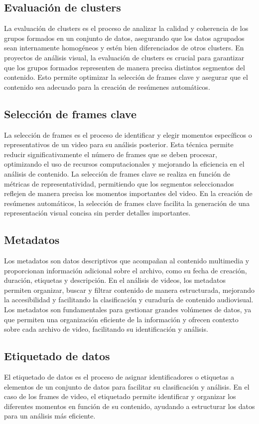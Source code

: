 \subsection{Evaluación de clusters}
La evaluación de clusters es el proceso de analizar la calidad y coherencia de los grupos formados en un conjunto de datos, asegurando que los datos agrupados sean internamente homogéneos y estén bien diferenciados de otros clusters. En proyectos de análisis visual, la evaluación de clusters es crucial para garantizar que los grupos formados representen de manera precisa distintos segmentos del contenido. Esto permite optimizar la selección de frames clave y asegurar que el contenido sea adecuado para la creación de resúmenes automáticos.

\subsection{Selección de frames clave}
La selección de frames es el proceso de identificar y elegir momentos específicos o representativos de un video para su análisis posterior. Esta técnica permite reducir significativamente el número de frames que se deben procesar, optimizando el uso de recursos computacionales y mejorando la eficiencia en el análisis de contenido. La selección de frames clave se realiza en función de métricas de representatividad, permitiendo que los segmentos seleccionados reflejen de manera precisa los momentos importantes del video. En la creación de resúmenes automáticos, la selección de frames clave facilita la generación de una representación visual concisa sin perder detalles importantes.

\subsection{Metadatos}
Los metadatos son datos descriptivos que acompañan al contenido multimedia y proporcionan información adicional sobre el archivo, como su fecha de creación, duración, etiquetas y descripción. En el análisis de videos, los metadatos permiten organizar, buscar y filtrar contenido de manera estructurada, mejorando la accesibilidad y facilitando la clasificación y curaduría de contenido audiovisual. Los metadatos son fundamentales para gestionar grandes volúmenes de datos, ya que permiten una organización eficiente de la información y ofrecen contexto sobre cada archivo de video, facilitando su identificación y análisis.

\subsection{Etiquetado de datos}
El etiquetado de datos es el proceso de asignar identificadores o etiquetas a elementos de un conjunto de datos para facilitar su clasificación y análisis. En el caso de los frames de video, el etiquetado permite identificar y organizar los diferentes momentos en función de su contenido, ayudando a estructurar los datos para un análisis más eficiente.

